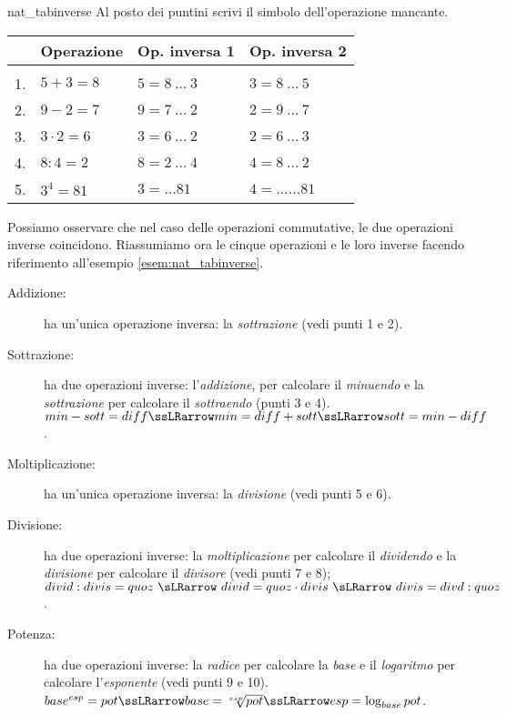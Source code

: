 \begin{esempio}{}{nat_tabinverse}
Al posto dei puntini scrivi il simbolo dell'operazione mancante.

\begin{center}
\begin{tabular}{rlll}
 & Operazione & Op. inversa 1 & Op. inversa 2\\ \hline \\ [-.5em]
1. & \(5 + 3 = 8\) & \(5 = 8 ~\dots~ 3\) & \(3 = 8 ~\dots~ 5\)\\ 
2. & \(9 - 2 = 7\) & \(9 = 7 ~\dots~ 2\) & \(2 = 9 ~\dots~ 7\)\\
3. & \(3 \cdot 2 = 6\) & \(3 = 6 ~\dots~ 2\) & \(2 = 6 ~\dots~ 3\)\\
4. & \(8 : 4 = 2\) & \(8 = 2 ~\dots~ 4\) & \(4 = 8 ~\dots~ 2\)\\
5. & \(3 ^4 = 81\) & \(3 = \dots 81\) & \(4 = \dots\! \dots 81\)\\
\hline
\end{tabular}
\end{center}
\end{esempio}
Possiamo osservare che nel caso delle operazioni commutative, le due 
operazioni inverse coincidono.
Riassumiamo ora le cinque operazioni e le loro inverse facendo riferimento 
all'esempio \ref{esem:nat_tabinverse}. %
\begin{description} %
\item [Addizione:] ha un'unica operazione inversa: 
la \emph{sottrazione} 
(vedi punti 1 e 2). 
\item [Sottrazione:] ha due operazioni inverse: 
l'\emph{addizione}, per calcolare il \emph{minuendo} e 
la \emph{sottrazione} per calcolare il \emph{sottraendo} 
(punti 3 e 4). \\
\(min-sott = diff \ssLRarrow min = diff+sott \ssLRarrow sott = min-diff\).
\item [Moltiplicazione:] ha un'unica operazione inversa: 
la \emph{divisione} 
(vedi punti 5 e 6). 
\item [Divisione:] ha due operazioni inverse: 
la \emph{moltiplicazione} per calcolare il \emph{dividendo} e 
la \emph{divisione} per calcolare il \emph{divisore} 
(vedi punti 7 e 8); \\
\(divid : divis = quoz ~\sLRarrow~ divid = quoz \cdot divis ~\sLRarrow~ 
divis = divd : quoz\). 
\item [Potenza:] ha due operazioni inverse: 
la \emph{radice} per calcolare la \emph{base} e 
il \emph{logaritmo} per calcolare l'\emph{esponente} 
(vedi punti 9 e 10). \\
\(base^{esp} = pot \ssLRarrow base = \sqrt[esp]{pot} \ssLRarrow 
esp = \log_{base}{pot}\). 
\end{description}


